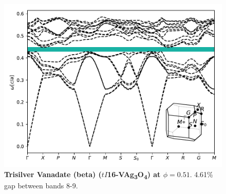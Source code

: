 \documentclass[fleqn,amsmath,amssymb,superscriptaddress, reprint,prl]{revtex4-1}
\begin{document}
\begin{figure}
\includegraphics[width=0.9\linewidth]{workspace/5e69c9c36c92e18b5e9b39de9563b888/images/r=21.pdf}
	\caption{\textbf{Trisilver Vanadate (beta) ($tI$16-VAg\textsubscript{3}O\textsubscript{4}) at $\phi=0.51$}. 4.61\% gap between bands 8-9.}
\end{figure}
\end{document}
